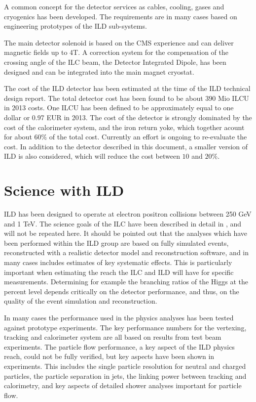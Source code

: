 \documentclass[%
 amsmath,amssymb,
 aps,
]{revtex4-1}
\begin{document}
A common concept for the detector services as cables, cooling, gases and cryogenics has been developed. The requirements are in many cases based on engineering prototypes of the ILD sub-systems. 

The main detector solenoid is based on the CMS experience and can deliver magnetic fields up to 4T. A correction system for the compensation of the crossing angle of the ILC beam, the Detector Integrated Dipole, has been designed and can be integrated into the main magnet cryostat.

The cost of the ILD detector has been estimated at the time of the ILD technical design report. The total detector cost has been found to be about $390 $ Mio ILCU in 2013 costs. One ILCU has been defined to be approximately equal to one dollar or 0.97 EUR in 2013. The cost of the detector is strongly dominated by the cost of the calorimeter system, and the iron return yoke, which together acount for about $60\%$ of the total cost. Currently an effort is ongoing to re-evaluate the cost. In addition to the detector described in this document, a smaller version of ILD is also considered, which will reduce the cost between $10$ and $20\%$. 

\section{Science with ILD}
ILD has been designed to operate at electron positron collisions between 250 GeV and 1 TeV. The science goals of the ILC have been described in detail in \cite{ILCESU1}, and will not be repeated here. It should be pointed out that the analyses which have been performed within the ILD group are based on fully simulated events, reconstructed with a realistic detector model and reconstruction software, and in many cases includes estimates of key systematic effects. This is particularly important when estimating the reach the ILC and ILD will have for specific measurements. Determining for example the branching ratios of the Higgs at the percent level depends critically on the detector performance, and thus, on the quality of the event simulation and reconstruction. 

In many cases the performance used in the physics analyses has been tested against prototype experiments. The key performance numbers for the vertexing, tracking and calorimeter system are all based on results from test beam experiments. The particle flow performance, a key aspect of the ILD physics reach, could not be fully verified, but key aspects have been shown in experiments. This includes the single particle resolution for neutral and charged particles, the particle separation in jets, the linking power between tracking and calorimetry, and key aspects of detailed shower analyses important for particle flow. 
\end{document}
